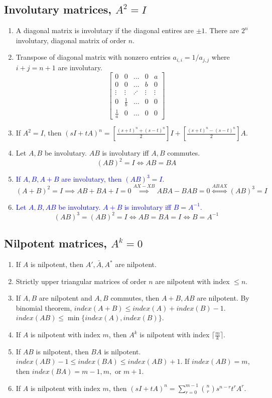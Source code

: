 \subsection{Involutary matrices, $A^2=I$}
\begin{enumerate}
	\item A diagonal matrix is involutary if the diagonal entires are $\pm 1$.
		\subitem There are $2^n$ involutary, diagonal matrix of order $n$.
	\item Transpose of diagonal matrix with nonzero entries $a_{i,i} = 1/a_{j,j}$ where $i+j = n+1$ are involutary.
		$$\begin{bmatrix}0 & 0 & \dots & 0 & a \\ 0 & 0 & \dots & b & 0 \\ \vdots & \vdots & \iddots & \vdots & \vdots \\ 0 & \frac{1}{b} & \dots & 0 & 0 \\ \frac{1}{a} & 0 & \dots & 0 & 0 \end{bmatrix}$$
	\item If $A^2 = I$, then $(sI+tA)^n = \left[\frac{(s+t)^n+(s-t)^n}{2}\right]I + \left[\frac{(s+t)^n-(s-t)^n}{2}\right]A$.
	\item Let $A,B$ be involutary. $AB$ is involutary iff $A,B$ commutes.
		$$ (AB)^2 = I \iff AB = BA $$
	\item \textcolor{blue}{If $A,B,A+B$ are involutary, then $(AB)^3 = I$.}
		$$(A+B)^2 = I \implies AB+BA+I = 0 \overset{AX-XB}{\implies} ABA-BAB = 0 \overset{ABAX}{\iff} (AB)^3=I $$
	\item \textcolor{blue}{Let $A,B,AB$ be involutary. $A+B$ is involutary iff $B=A^{-1}$.}
		$$ (AB)^3 = (AB)^2 = I \iff AB = BA = I  \iff B = A^{-1} $$
\end{enumerate}

\subsection{Nilpotent matrices, $A^k=0$}
\begin{enumerate}
	\item If $A$ is nilpotent, then $A',\bar{A},A^\ast$ are nilpotent.
	\item Strictly upper triangular matrices of order $n$ are nilpotent with index $\le n$.
	\item If $A,B$ are nilpotent and $A,B$ commutes, then $A+B,AB$ are nilpotent.
		\subitem By binomial theorem, $index(A+B) \le index(A) + index(B) -1$.
		\subitem $index(AB) \le \min\{ index(A),index(B) \}$.
	\item If $A$ is nilpotent with index $m$, then $A^k$ is nilpotent with index $\lceil \frac{m}{k} \rceil$.
	\item If $AB$ is nilpotent, then $BA$ is nilpotent.
		\subitem $index(AB)-1 \le index(BA) \le index(AB)+1$.
		\subitem If $index(AB) = m$, then $index(BA) = m-1,m, \text{ or } m+1$.
	\item If $A$ is nilpotent with index $m$, then $(sI+tA)^n = \sum_{r=0}^{m-1}\binom{n}{r} s^{n-r}t^rA^r$.
\end{enumerate}

